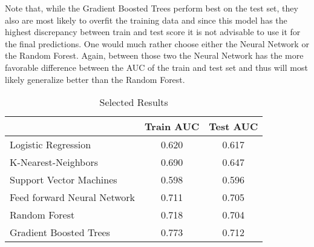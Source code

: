 
Note that, while the Gradient Boosted Trees perform best on the test set, they also are most likely to overfit the training data and since this model has the highest discrepancy between train and test score it is not advisable to use it for  the final predictions. One would much rather choose either the Neural Network or the Random Forest. Again, between those two the Neural Network has the more favorable difference between the AUC of the train and test set and thus will most likely generalize better 
than the Random Forest.

\begin{table}[hb]
\centering
\caption{Selected Results}
\begin{tabular}{lcc}

                            & Train AUC & Test AUC \\ \hline
Logistic Regression         & 0.620     & 0.617    \\
K-Nearest-Neighbors         & 0.690     & 0.647    \\
Support Vector Machines     & 0.598     & 0.596    \\
Feed forward Neural Network & 0.711     & 0.705    \\
Random Forest               & 0.718     & 0.704    \\
Gradient Boosted Trees      & 0.773     & 0.712   
\end{tabular}
\end{table}
